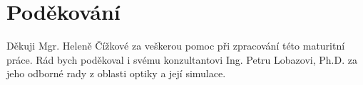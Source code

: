 \vspace*{\fill}

\chapter*{Poděkování}

Děkuji Mgr. Heleně Čížkové za veškerou pomoc při zpracování této maturitní práce. Rád bych poděkoval i svému konzultantovi Ing. Petru Lobazovi, Ph.D. za jeho odborné rady z oblasti optiky a její simulace.

\vspace*{1cm}
